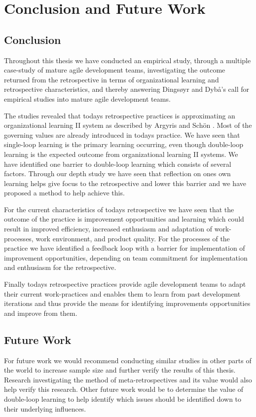 \chapter{Conclusion and Future Work}
\section{Conclusion}
Throughout this thesis we have conducted an empirical study, through a multiple case-study of mature agile development teams, investigating the outcome returned from the retrospective in terms of organizational learning and retrospective characteristics, and thereby answering Dingsøyr and Dybå’s call \cite{Dyba2008} for empirical studies into mature agile development teams.

The studies revealed that todays retrospective practices is approximating an organizational learning II system as described by Argyris and Schön \cite{Argyris1996}. Most of the governing values are already introduced in todays practice. We have seen that single-loop learning is the primary learning occurring, even though double-loop learning is the expected outcome from organizational learning II systems. We have identified one barrier to double-loop learning which consists of several factors. Through our depth study we have seen that reflection on ones own learning helps give focus to the retrospective and lower this barrier and we have proposed a method to help achieve this. 

For the current characteristics of todays retrospective we have seen that the outcome of the practice is improvement opportunities and learning which could result in improved efficiency, increased enthusiasm and adaptation of work-processes, work environment, and product quality. For the processes of the practice we have identified a feedback loop with a barrier for implementation of improvement opportunities, depending on team commitment for implementation and enthusiasm for the retrospective. 

Finally todays retrospective practices provide agile development teams to adapt their current work-practices and enables them to learn from past development iterations and thus provide the means for identifying improvements opportunities and improve from them. 

\section{Future Work}
For future work we would recommend conducting similar studies in other parts of the world to increase sample size and further verify the results of this thesis. Research investigating the method of meta-retrospectives and its value would also help verify this research. Other future work would be to determine the value of double-loop learning to help identify which issues should be identified down to their underlying influences. 


